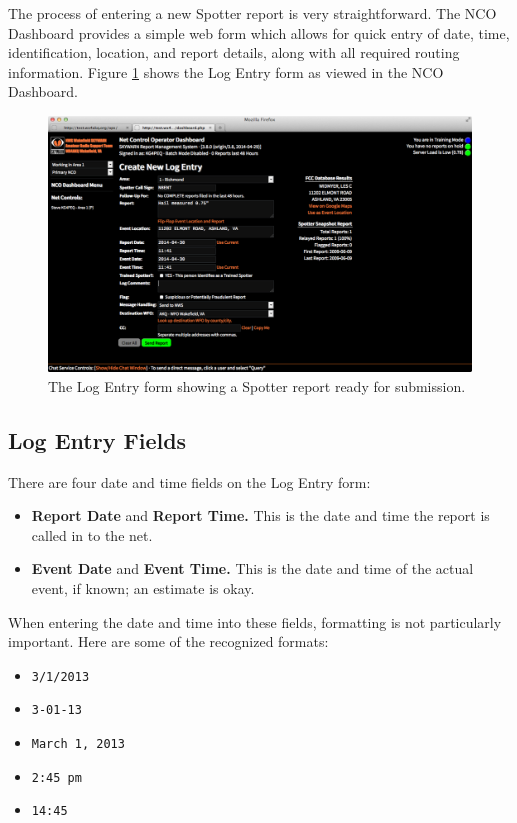 \documentclass[pdflatex,letterpaper,twoside,12pt]{book}
\begin{document}
The process of entering a new Spotter report is very straightforward.  The NCO Dashboard provides a simple web form which allows for quick entry of date, time, identification, location, and report details, along with all required routing information.  Figure \ref{fig:dash-report-create} shows the Log Entry form as viewed in the NCO Dashboard.

\begin{figure}[h]
  \centering
  \includegraphics[width=\textwidth,keepaspectratio=true]{img/dash-report-create}
  \caption{The Log Entry form showing a Spotter report ready for submission.\label{fig:dash-report-create}}
\end{figure}

\subsection{Log Entry Fields}

There are four date and time fields on the Log Entry form:

\begin{itemize}
\item \textbf{Report Date} and \textbf{Report Time.}  This is the date and time the report is called in to the net.
\item \textbf{Event Date} and \textbf{Event Time.}  This is the date and time of the actual event, if known;  an estimate is okay.
\end{itemize}

When entering the date and time into these fields, formatting is not particularly important.  Here are some of the recognized formats:

\begin{itemize}
\item \verb|3/1/2013|
\item \verb|3-01-13|
\item \verb|March 1, 2013|
\item \verb|2:45 pm|
\item \verb|14:45|
\end{itemize}
\end{document}
